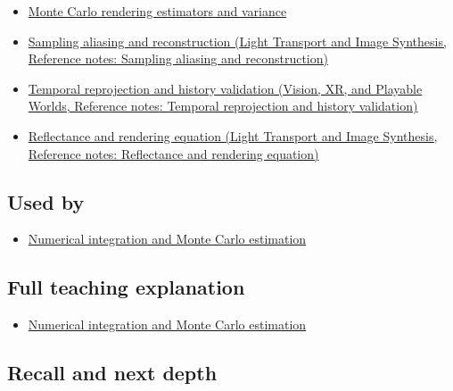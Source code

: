 \begin{itemize}
\tightlist
\item
  \hyperref[appendix-031e02bf28af]{Monte Carlo rendering estimators and variance}
\item
  \href{../04-Light-Transport-and-Image-Synthesis/main.pdf\#nameddest=appendix-6a7869dd79a6}{Sampling aliasing and reconstruction (Light Transport and Image Synthesis, Reference notes: Sampling aliasing and reconstruction)}
\item
  \href{../07-Vision-XR-and-Playable-Worlds/main.pdf\#nameddest=appendix-0727340a4428}{Temporal reprojection and history validation (Vision, XR, and Playable Worlds, Reference notes: Temporal reprojection and history validation)}
\item
  \href{../04-Light-Transport-and-Image-Synthesis/main.pdf\#nameddest=appendix-96da0b153b77}{Reflectance and rendering equation (Light Transport and Image Synthesis, Reference notes: Reflectance and rendering equation)}
\end{itemize}

\subsection{Used by}\label{appendix-68be451b78b1-used-by}

\begin{itemize}
\tightlist
\item
  \hyperref[03-visual-computing-i-ch012-numerical-integration-and-monte-carlo-estimation]{Numerical integration and Monte Carlo estimation}
\end{itemize}

\subsection{Full teaching explanation}\label{appendix-68be451b78b1-full-teaching-explanation}

\begin{itemize}
\tightlist
\item
  \hyperref[03-visual-computing-i-ch012-numerical-integration-and-monte-carlo-estimation]{Numerical integration and Monte Carlo estimation}
\end{itemize}

\subsection{Recall and next depth}\label{appendix-68be451b78b1-recall-and-next-depth}

